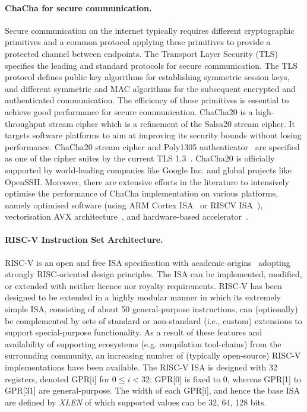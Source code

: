 \paragraph{ChaCha for secure communication.}
Secure communication on the internet typically requires different cryptographic primitives and a common protocol applying these primitives to provide a protected channel between endpoints.
The Transport Layer Security (TLS) specifies the leading and standard protocols for secure communication.
The TLS protocol defines public key algorithms for establishing symmetric session keys, and different symmetric and MAC algorithms for the subsequent encrypted and authenticated communication.
The efficiency of these primitives is essential to achieve good performance for secure communication.
ChaCha20 is a high-throughput stream cipher which is a refinement of the Salsa20 stream cipher. It targets software platforms to aim at improving its security bounds without losing performance. ChaCha20 stream cipher and Poly1305 authenticator~\cite{RFC:16} are specified as one of the cipher suites by the current TLS 1.3~\cite[Section 9.1]{RFC:18:8446}.
ChaCha20 is officially supported by world-leading companies like Google Inc. and global projects like OpenSSH.
Moreover, there are extensive efforts in the literature to intensively optimise the performance of ChaCha implementation on various platforms, namely optimised software (using ARM Cortex ISA~\cite{SSS:17} or RISCV ISA~\cite{Sto:19}), vectorisation AVX architecture~\cite{GolGue:14}, and hardware-based accelerator~\cite{KLA:19}.  

\paragraph{RISC-V Instruction Set Architecture.}
RISC-V is an open and free ISA specification with academic origins~\cite{riscv:14} adopting strongly RISC-oriented design principles. 
The ISA can be implemented, modified, or extended with neither licence nor royalty requirements.
RISC-V has been designed to be extended in a highly modular manner 
in which its extremely simple ISA, consisting of about 50 general-purpose instructions, can (optionally) be complemented by sets of
standard or non-standard (i.e., custom) extensions to support special-purpose functionality.
As a result of these features and availability of supporting ecosystems (e.g. compilation tool-chains) from the surrounding community,
an increasing number of (typically open-source) RISC-V implementations have been available.
The RISC-V ISA is designed with 32 registers, denoted GPR[i] for $0 \le i < 32$: GPR[0] is fixed to 0, whereas GPR[1] to GPR[31] are general-purpose. 
The width of each GPR[i], and hence the base ISA are defined by \emph{XLEN} of which supported values can be 32, 64, 128 bits. 


